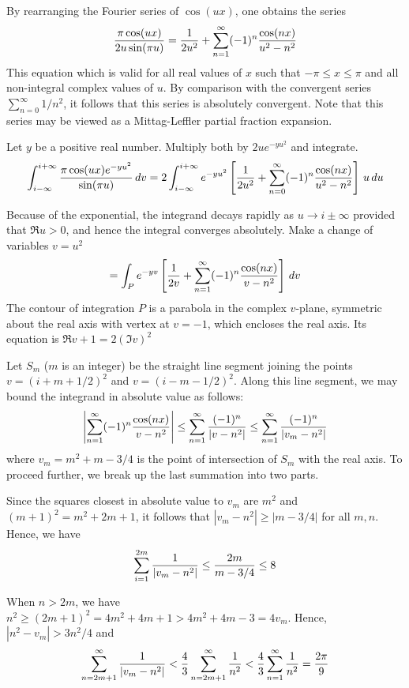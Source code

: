 \documentclass[12pt]{article}
\begin{document}
By rearranging the Fourier series of $\cos (ux)$, one obtains the series
 $${ \pi \cos (u x) \over 2 u \sin (\pi u)} = {1 \over 2 u^2} + \sum_{n=1}^\infty (-1)^n {\cos (nx) \over u^2 - n^2}$$
This equation which is valid for all real values of $x$ such that $-\pi \le x \le \pi$ and all non-integral complex values of $u$.  By comparison with the convergent series $\sum_{n=0}^\infty 1/n^2$, it follows that this series is absolutely convergent.  Note that this series may be viewed as a Mittag-Leffler partial fraction expansion.  

Let $y$ be a positive real number.  Multiply both  by $2 u e^{-y u^2}$ and integrate.
 $$\int_{i-\infty}^{i + \infty} {\pi \cos (u x) e^{-yu^2} \over \sin (\pi u)} \, dv = 2 \int_{i-\infty}^{i + \infty} e^{-y u^2} \left[ {1 \over 2 u^2} + \sum_{n=0}^\infty (-1)^n {\cos (nx) \over u^2 - n^2} \right] \, u \, du$$

Because of the exponential, the integrand decays rapidly as $u \to i \pm \infty$ provided that $\Re u > 0$, and hence the integral converges absolutely.  Make a change of variables $v = u^2$
 $$= \int_P e^{-y v} \left[ {1 \over 2 v} + \sum_{n=1}^\infty (-1)^n {\cos(nx)\over v - n^2} \right] \, dv$$
The contour of integration $P$ is a parabola in the complex $v$-plane, symmetric about the real axis with vertex at $v = -1$, which encloses the real axis.  Its equation is $\Re v + 1 = 2 (\Im v)^2$

Let $S_m$ ($m$ is an integer) be the straight line segment joining the points $v = (i + m + 1/2)^2$ and $v = (i - m - 1/2)^2$.  Along this line segment, we may bound the integrand in absolute value as follows:
 $$\left| \sum_{n=1}^\infty (-1)^n {\cos (nx) \over v - n^2} \right| \le \sum_{n=1}^\infty {(-1)^n \over |v - n^2|} \le \sum_{n=1}^\infty {(-1)^n \over |v_m - n^2|}$$
where $v_m = m^2 + m - 3/4$ is the point of intersection of $S_m$ with the real axis.  To proceed further, we break up the last summation into two parts.

Since the squares closest in absolute value to $v_m$ are $m^2$ and $(m+1)^2 = m^2 + 2m + 1$, it follows that $|v_m - n^2| \ge |m - 3/4|$ for all $m,n$.  Hence, we have
 $$\sum_{i=1}^{2m} {1 \over |v_m - n^2|} \le {2m \over m - 3/4} \le 8$$

When $n > 2m$, we have $n^2 \ge (2m+1)^2 = 4m^2 + 4m + 1 > 4m^2 + 4m - 3 = 4 v_m$.  Hence, $|n^2 - v_m| > 3 n^2 /4$ and
 $$\sum_{n = 2m+1}^\infty {1 \over |v_m - n^2|} < {4 \over 3} \sum_{n = 2m+1}^\infty {1 \over n^2} < {4 \over 3} \sum_{n = 1}^\infty {1 \over n^2} = {2 \pi \over 9}$$
\end{document}
